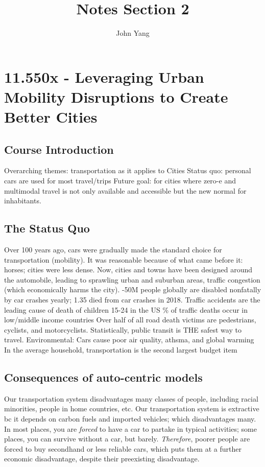 \documentclass{article}
\title{Notes Section 2} %
\author{John Yang}
\begin{document}
    \maketitle
    \tableofcontents
    \section{11.550x - Leveraging Urban Mobility Disruptions to Create Better Cities}
    \subsection{Course Introduction}
    \begin{outline}
        \1 Overarching themes: transportation as it applies to Cities 
            \2 Status quo: personal cars are used for most travel/trips
            \2 Future goal: for cities where zero-e and multimodal travel is not only available and accessible but the new normal for inhabitants. 

    \end{outline}
    \subsection{The Status Quo}
    \begin{outline}
        \1 Over 100 years ago, cars were gradually made the standard choice for transportation (mobility). It was reasonable because of what came before it: horses; cities were less dense. 
        \1 Now, cities and towns have been designed around the automobile, leading to sprawling urban and suburban areas, traffic congestion (which economically harms the city). 
        -50M people globally are disabled nonfatally by car crashes yearly; 1.35 died from car crashes in 2018. 
        \1 Traffic accidents are the leading cause of death of children 15-24 in the US 
        \% of traffic deaths occur in low/middle income countries
        \1 Over half of all road death victims are pedestrians, cyclists, and motorcyclists. 
        \1 Statistically, public transit is THE safest way to travel. 
        \1 Environmental: Cars cause poor air quality, athsma, and global warming
        \1 In the average household, transportation is the second largest budget item 

    \end{outline}
    \subsection{Consequences of auto-centric models}
    \begin{outline}
        \1 Our transportation system disadvantages many classes of people, including racial minorities, people in home countries, etc. 
        \1 Our transportation system is extractive bc it depends on carbon fuels and imported vehicles; which disadvantages many. 
        \1 In most places, you are \textit{forced} to have a car to partake in typical activities; some places, you can survive without a car, but barely.
            \2 \textit{Therefore}, poorer people are forced to buy secondhand or less reliable cars, which puts them at a further economic disadvantage, despite their preexisting disadvantage. 
    \end{outline}
\end{document}
